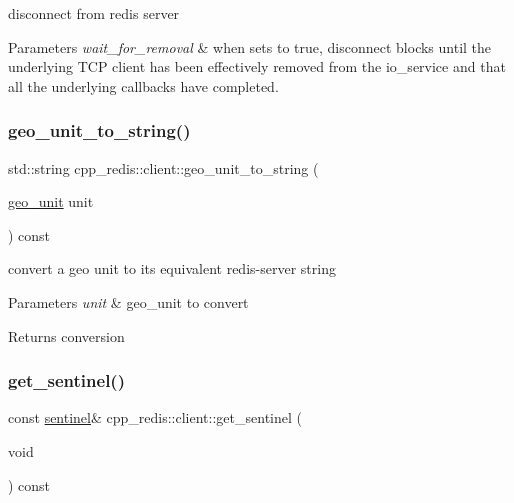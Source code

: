 disconnect from redis server


\begin{DoxyParams}{Parameters}
{\em wait\+\_\+for\+\_\+removal} & when sets to true, disconnect blocks until the underlying T\+CP client has been effectively removed from the io\+\_\+service and that all the underlying callbacks have completed. \\
\hline
\end{DoxyParams}
\mbox{\label{classcpp__redis_1_1client_aa8a686097a5340eb50e838f14342e302}} 
\subsubsection{\texorpdfstring{geo\+\_\+unit\+\_\+to\+\_\+string()}{geo\_unit\_to\_string()}}
{\footnotesize\ttfamily std\+::string cpp\+\_\+redis\+::client\+::geo\+\_\+unit\+\_\+to\+\_\+string (\begin{DoxyParamCaption}\item[{\hyperlink{classcpp__redis_1_1client_aa5998536fd32ff4387c89be514997620}{geo\+\_\+unit}}]{unit }\end{DoxyParamCaption}) const}

convert a geo unit to its equivalent redis-\/server string


\begin{DoxyParams}{Parameters}
{\em unit} & geo\+\_\+unit to convert \\
\hline
\end{DoxyParams}
\begin{DoxyReturn}{Returns}
conversion 
\end{DoxyReturn}
\mbox{\label{classcpp__redis_1_1client_a9f94860dad26bca4e860a56ca8aefe36}} 
\subsubsection{\texorpdfstring{get\+\_\+sentinel()}{get\_sentinel()}\hspace{0.1cm}{\footnotesize\ttfamily [1/2]}}
{\footnotesize\ttfamily const \hyperlink{classcpp__redis_1_1sentinel}{sentinel}\& cpp\+\_\+redis\+::client\+::get\+\_\+sentinel (\begin{DoxyParamCaption}\item[{void}]{ }\end{DoxyParamCaption}) const}

